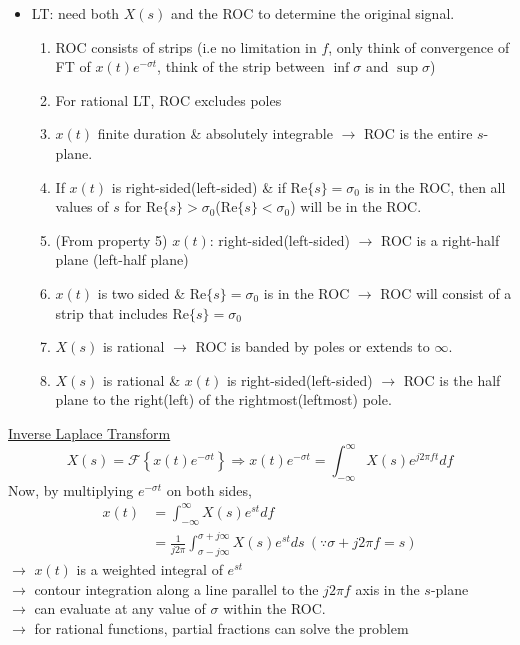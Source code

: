 \documentclass{article}
\newcommand{\ft}[1]{\mathcal{F}\left\{#1\right\}}
\begin{document}
\begin{itemize}
    \item LT: need both $X(s)$ and the ROC to determine the original signal.
    \begin{enumerate}
        \item ROC consists of strips (i.e no limitation in $f$, only think of convergence of FT of $x(t)e^{-\sigma t}$, think of the strip between $\inf\sigma$ and $\sup\sigma$)
        \item For rational LT, ROC excludes poles
        \item $x(t)$ finite duration \& absolutely integrable $\rightarrow$ ROC is the entire $s$-plane.
        \item If $x(t)$ is right-sided(left-sided) \& if $\mathrm{Re}\{s\}=\sigma_0$ is in the ROC, then all values of $s$ for $\mathrm{Re}\{s\} > \sigma_0$($\mathrm{Re}\{s\} < \sigma_0$) will be in the ROC. 
        \item (From property 5) $x(t)$: right-sided(left-sided) $\rightarrow$ ROC is a right-half plane (left-half plane)
        \item $x(t)$ is two sided \& $\mathrm{Re}\{s\} = \sigma_0$ is in the ROC $\rightarrow$ ROC will consist of a strip that includes $\mathrm{Re}\{s\} = \sigma_0$
        \item $X(s)$ is rational $\rightarrow$ ROC is banded by poles or extends to $\infty$.
        \item $X(s)$ is rational \& $x(t)$ is right-sided(left-sided) $\rightarrow$ ROC is the half plane to the right(left) of the rightmost(leftmost) pole.
    \end{enumerate}
\end{itemize}
\underline{Inverse Laplace Transform}
\[X(s)=\ft{x(t)e^{-\sigma t}}\Rightarrow x(t)e^{-\sigma t}=\int_{-\infty}^{\infty}X(s)e^{j2\pi ft}df\]
Now, by multiplying $e^{-\sigma t}$ on both sides,
\begin{align*}
    x(t)&=\int_{-\infty}^{\infty}X(s)e^{st}df\\
    &=\frac{1}{j2\pi}\int_{\sigma -j\infty}^{\sigma+j\infty}X(s)e^{st}ds\:(\because\sigma+j2\pi f=s)
\end{align*}
$\rightarrow$ $x(t)$ is a weighted integral of $e^{st}$\\
$\rightarrow$ contour integration along a line parallel to the $j2\pi f$ axis in the $s$-plane\\
$\rightarrow$ can evaluate at any value of $\sigma$ within the ROC.\\
$\rightarrow$ for rational functions, partial fractions can solve the problem
\end{document}
